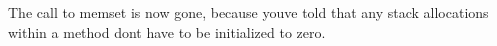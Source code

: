 \begin{DoxyCode}{0}
\end{DoxyCode}


The call to memset is now gone, because you\textquotesingle{}ve told  that any stack allocations within a method don\textquotesingle{}t have to be initialized to zero. 